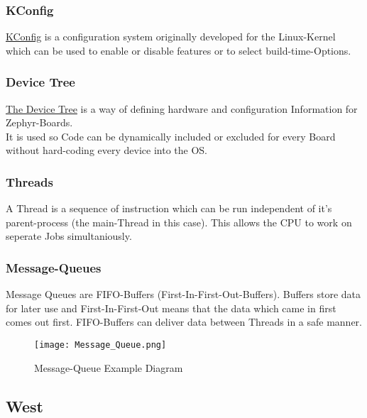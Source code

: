 \subsubsection{KConfig}

\href{https://www.kernel.org/doc/html/latest/kbuild/kconfig-language.html}
{KConfig} is a configuration system originally developed for the Linux-Kernel
which can be used to enable or disable features or to select build-time-Options.

\subsubsection{Device Tree}

\href{https://docs.zephyrproject.org/2.0.0/guides/dts/index.html}
{The Device Tree} is a way of defining hardware and configuration
Information for Zephyr-Boards.
\\
It is used so Code can be dynamically included or excluded for
every Board without hard-coding every device into the OS.

\subsubsection{Threads}

A Thread is a sequence of instruction which can be run
independent of it's parent-process (the main-Thread in this case).
This allows the CPU to work on seperate Jobs simultaniously.

\subsubsection{Message-Queues}

Message Queues are FIFO-Buffers (First-In-First-Out-Buffers).
Buffers store data for later use and First-In-First-Out means
that the data which came in first comes out first.
FIFO-Buffers can deliver data between Threads in a safe manner.

\begin{figure}[!ht]
	\begin{center}
		\texttt{[image: Message\_Queue.png]}
		\caption{Message-Queue Example Diagram}
	\end{center}
\end{figure}

\pagebreak

\subsection{West}

